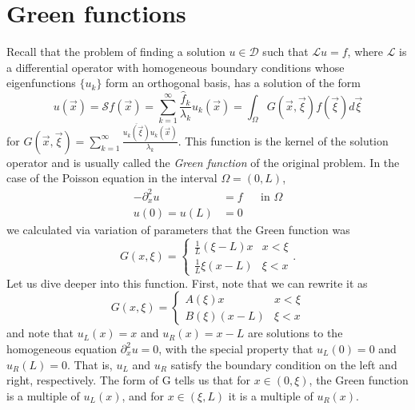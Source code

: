 \section{Green functions}\label{sec:green-functions}
Recall that the problem of finding a solution $u\in\mathcal{D}$ such that $\mathcal{L}u=f$, where $\mathcal{L}$ is a differential operator with homogeneous boundary conditions whose eigenfunctions $\{u_k\}$ form an orthogonal basis, has a solution of the form
\begin{equation}
    u(\vec{x})=\mathcal{S}f(\vec{x})=\sum_{k=1}^{\infty}\frac{\hat{f}_{k}}{\lambda_{k}}u_{k}(\vec{x})=\int_{\Omega}G(\vec{x},\vec{\xi})f(\vec{\xi})d\vec{\xi}
\end{equation}
for $G(\vec{x},\vec{\xi})=\sum_{k=1}^{\infty}\frac{\overline{u_{k}(\vec{\xi})}u_{k}(\vec{x})}{\lambda_{k}}$.  This function is the kernel of the solution operator and is usually called the \emph{Green function} of the original problem. In the case of the Poisson equation in the interval $\Omega = (0,L)$,
\begin{equation}
    \begin{aligned}
        -\partial_{x}^{2}u&=f&&\text{in }\Omega\\ 
        u(0)=u(L)&=0
    \end{aligned}
\end{equation}
we calculated via variation of parameters that the Green function was
\begin{equation}
    G(x,\xi)=\begin{cases}\frac{1}{L}(\xi-L)x&x<\xi\\ \frac{1}{L}\xi(x-L)&\xi<x\end{cases}.
\end{equation}
Let us dive deeper into this function. First, note that we can rewrite it as 
\begin{equation}
    G(x,\xi)=\begin{cases}A(\xi)x&x<\xi\\ B(\xi)(x-L)&\xi<x\end{cases}
\end{equation}
and note that $u_{L}(x)=x$ and $u_{R}(x)=x-L$ are solutions to the homogeneous equation $\partial_{x}^{2}u=0$, with the special property that $u_{L}(0)=0$ and $u_{R}(L)=0$. That is, $u_L$ and $u_R$ satisfy the boundary condition on the left and right, respectively. The form of G tells us that for $x \in (0,\xi)$, the Green function is a multiple of $u_L(x)$, and for $x \in (\xi,L)$ it is a multiple of $u_R(x)$. 

